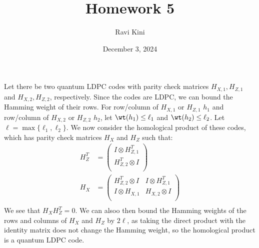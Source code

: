 \documentclass{article}
\title{Homework 5}
\author{Ravi Kini}
\date{December 3, 2024}
\begin{document}
\maketitle

\problem
Let there be two quantum LDPC codes with parity check matrices $H_{X,1}, H_{Z,1}$ and $H_{X,2}, H_{Z,2}$, respectively. Since the codes are LDPC, we can bound the Hamming weight of their rows. For row/column of $H_{X,1}$ or $H_{Z,1}$ $h_1$ and row/column of $H_{X,2}$ or $H_{Z,2}$ $h_2$, let $\wt(h_1) \leq \ell_1$ and $\wt(h_2) \leq \ell_2$. Let $\ell = \max\{\ell_1, \ell_2\}$. We now consider the homological product of these codes, which has parity check matrices $H_X$ and $H_Z$ such that:
\begin{align*}
    H_Z^T & = \begin{pmatrix}
        I \otimes H_{Z,1}^T \\
        H_{Z,2}^T \otimes I \\
    \end{pmatrix} \\
    H_X & = \begin{pmatrix}
        H_{Z,2}^T \otimes I & I \otimes H_{Z,1}^T \\
        I \otimes H_{X,1} & H_{X,2} \otimes I \\
    \end{pmatrix} \\
\end{align*}
We see that $H_XH_Z^T = 0$. We can alsoo then bound the Hamming weights of the rows and columns of $H_X$ and $H_Z$ by $2\ell$, as taking the direct product with the identity matrix does not change the Hamming weight, so the homological product is a quantum LDPC code.
\clearpage

\problem
\end{document}

